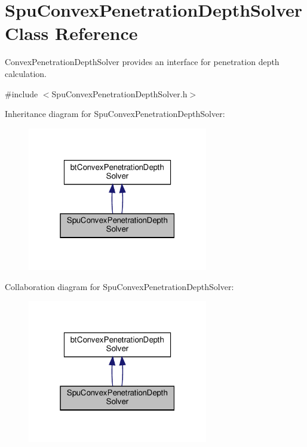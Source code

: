 \hypertarget{classSpuConvexPenetrationDepthSolver}{}\section{Spu\+Convex\+Penetration\+Depth\+Solver Class Reference}
\label{classSpuConvexPenetrationDepthSolver}


Convex\+Penetration\+Depth\+Solver provides an interface for penetration depth calculation.  




{\ttfamily \#include $<$Spu\+Convex\+Penetration\+Depth\+Solver.\+h$>$}



Inheritance diagram for Spu\+Convex\+Penetration\+Depth\+Solver\+:
\nopagebreak
\begin{figure}[H]
\begin{center}
\leavevmode
\includegraphics[width=223pt]{classSpuConvexPenetrationDepthSolver__inherit__graph}
\end{center}
\end{figure}


Collaboration diagram for Spu\+Convex\+Penetration\+Depth\+Solver\+:
\nopagebreak
\begin{figure}[H]
\begin{center}
\leavevmode
\includegraphics[width=223pt]{classSpuConvexPenetrationDepthSolver__coll__graph}
\end{center}
\end{figure}
